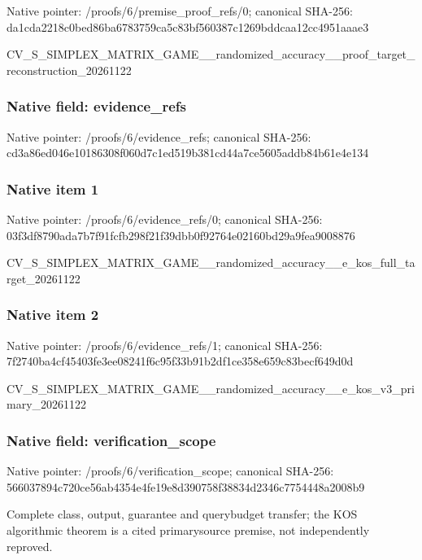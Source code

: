 \documentclass[10pt,a4paper]{article}
\begin{document}
Native pointer: /proofs/6/premise\_proof\_refs/0; canonical SHA-256: da1cda2218c0bed86ba67837\allowbreak{}59ca5c83bf560387c1269bdd\allowbreak{}caa12cc4951aaae3


CV\_S\_SIMPLEX\_MATRIX\_GAME\allowbreak{}\_\_randomized\_accuracy\_\_p\allowbreak{}roof\_target\_reconstructi\allowbreak{}on\_20261122


\subsubsection{Native field: evidence\_refs}


Native pointer: /proofs/6/evidence\_refs; canonical SHA-256: cd3a86ed046e10186308f060\allowbreak{}d7c1ed519b381cd44a7ce560\allowbreak{}5addb84b61e4e134



\subsubsection{Native item 1}


Native pointer: /proofs/6/evidence\_refs/0; canonical SHA-256: 03f3df8790ada7b7f91fcfb2\allowbreak{}98f21f39dbb0f92764e02160\allowbreak{}bd29a9fea9008876


CV\_S\_SIMPLEX\_MATRIX\_GAME\allowbreak{}\_\_randomized\_accuracy\_\_e\allowbreak{}\_kos\_full\_target\_2026112\allowbreak{}2


\subsubsection{Native item 2}


Native pointer: /proofs/6/evidence\_refs/1; canonical SHA-256: 7f2740ba4cf45403fe3ee082\allowbreak{}41f6c95f33b91b2df1ce358e\allowbreak{}659c83becf649d0d


CV\_S\_SIMPLEX\_MATRIX\_GAME\allowbreak{}\_\_randomized\_accuracy\_\_e\allowbreak{}\_kos\_v3\_primary\_20261122


\subsubsection{Native field: verification\_scope}


Native pointer: /proofs/6/verification\_scope; canonical SHA-256: 566037894c720ce56ab4354e\allowbreak{}4fe19e8d390758f38834d234\allowbreak{}6c7754448a2008b9


Complete class, output, guarantee and querybudget transfer; the KOS algorithmic theorem is a cited primarysource premise, not independently reproved.
\end{document}
